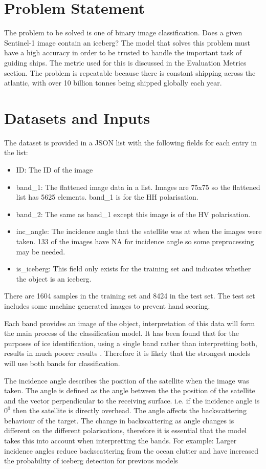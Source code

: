 \documentclass{article}
\begin{document}
\section{Problem Statement}
The problem to be solved is one of binary image classification. Does a given Sentinel-1 image contain an iceberg? The model that solves this problem must have a high accuracy in order to be trusted to handle the important task of guiding ships. The metric used for this is discussed in the Evaluation Metrics section. The problem is repeatable because there is constant shipping across the atlantic, with over 10 billion tonnes being shipped globally each year. \cite{unctad}


\section{Datasets and Inputs}
The dataset is provided in a JSON list with the following fields for each entry in the list:
\begin{itemize}
\item ID: The ID of the image
\item band\_1: The flattened image data in a list. Images are 75x75 so the flattened list has 5625 elements. band\_1 is for the HH polarisation.
\item band\_2: The same as band\_1 except this image is of the HV polarisation.
\item inc\_angle: The incidence angle that the satellite was at when the images were taken. 133 of the images have NA for incidence angle so some preprocessing may be needed.
\item is\_iceberg: This field only exists for the training set and indicates whether the object is an iceberg.
\end{itemize}
There are 1604 samples in the training set and 8424 in the test set. The test set includes some machine generated images to prevent hand scoring. 

Each band provides an image of the object, interpretation of this data will form the main process of the classification model. It has been found that for the purposes of ice identification, using a single band rather than interpretting both, results in much poorer results \cite{radarsat-mode-selection,yu}. Therefore it is likely that the strongest models will use both bands for classification.

The incidence angle describes the position of the satellite when the image was taken. The angle is defined as the angle between the the position of the satellite and the vector perpendicular to the receiving surface. i.e. if the incidence angle is $0^0$ then the satellite is directly overhead. The angle affects the backscattering behaviour of the target. The change in backscattering as angle changes is different on the different polarisations, therefore it is essential that the model takes this into account when interpretting the bands. For example: Larger incidence angles reduce backscattering from the ocean clutter and have increased the probability of iceberg detection for previous models \cite{radarsat-mode-selection}
\end{document}
